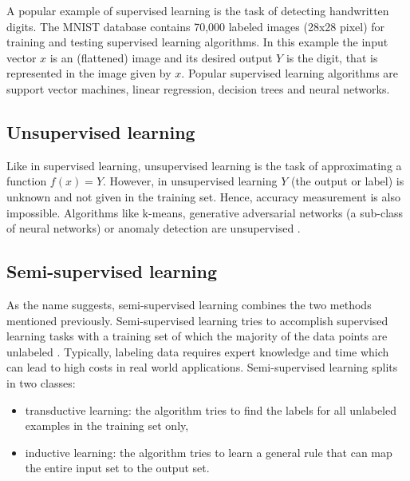 \documentclass[a4paper]{report}
\begin{document}
    A popular example of supervised learning is the task of detecting handwritten digits. The MNIST \cite{mnist} database contains 70,000 labeled images (28x28 pixel) for training and testing supervised learning algorithms. In this example the input vector $x$ is an (flattened) image and its desired output $Y$ is the digit, that is represented in the image given by $x$.
    Popular supervised learning algorithms are support vector machines, linear regression, decision trees and neural networks.
    
    \subsection{Unsupervised learning}
    Like in supervised learning, unsupervised learning is the task of approximating a function $f(x) = Y$. However, in unsupervised learning $Y$ (the output or label) is unknown and not given in the training set. Hence, accuracy measurement is also impossible. Algorithms like k-means, generative adversarial networks (a sub-class of neural networks) or anomaly detection are unsupervised \cite{unsupervised-learning}.
    
    \subsection{Semi-supervised learning}
    As the name suggests, semi-supervised learning combines the two methods mentioned previously. Semi-supervised learning tries to accomplish supervised learning tasks with a training set of which the majority of the data points are unlabeled \cite{semi-supervised-learning}. Typically, labeling data requires expert knowledge and time which can lead to high costs in real world applications. Semi-supervised learning splits in two classes:
    \begin{itemize}
    \item transductive learning: the algorithm tries to find the labels for all unlabeled examples in the training set only,
    \item inductive learning: the algorithm tries to learn a general rule that can map the entire input set to the output set.
    \end{itemize}
    
\end{document}
